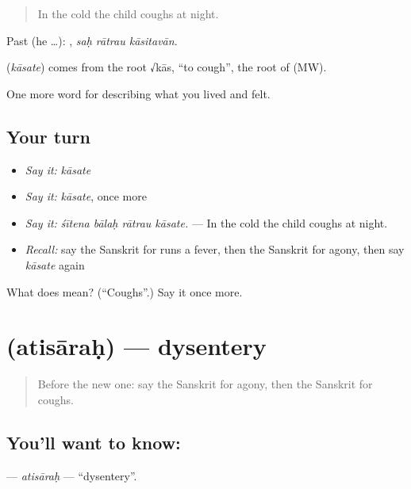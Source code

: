 \begin{quote}
In the cold the child coughs at night.
\end{quote}

Past (he …):   , \emph{saḥ rātrau kāsitavān}.

\begin{cousinweb}
\textbf{} (\emph{kāsate}) comes from the root √kās, \textquotedblleft{}to cough\textquotedblright{}, the root of \textbf{} (MW).
\end{cousinweb}

\begin{grammarlens}[title={What you've built}]
One more word for describing what you lived and felt.
\end{grammarlens}

\subsection*{Your turn}
\begin{itemize}
\raggedright
  \item \emph{Say it:} \emph{kāsate}
  \item \emph{Say it:} \emph{kāsate}, once more
  \item \emph{Say it:} \emph{śītena bālaḥ rātrau kāsate.} — In the cold the child coughs at night.
  \item \emph{Recall:} say the Sanskrit for runs a fever, then the Sanskrit for agony, then say \emph{kāsate} again
\end{itemize}

\begin{tcolorbox}[breakable,colback=teal!4,colframe=teal!35!black,title={Before you move on}]
What does  mean? (\textquotedblleft{}Coughs\textquotedblright{}.) Say it once more.
\end{tcolorbox}
\section[\texorpdfstring{\sk{अतिसारः} (atisāraḥ)}{अतिसारः (atisāraḥ)}]{ (atisāraḥ) — dysentery}

\label{lesson:SA-C478-atisarah}



\begin{quote}
Before the new one: say the Sanskrit for agony, then the Sanskrit for coughs.
\end{quote}

\subsection*{You'll want to know: }
\textbf{} — \emph{atisāraḥ} — \textquotedblleft{}dysentery\textquotedblright{}.

